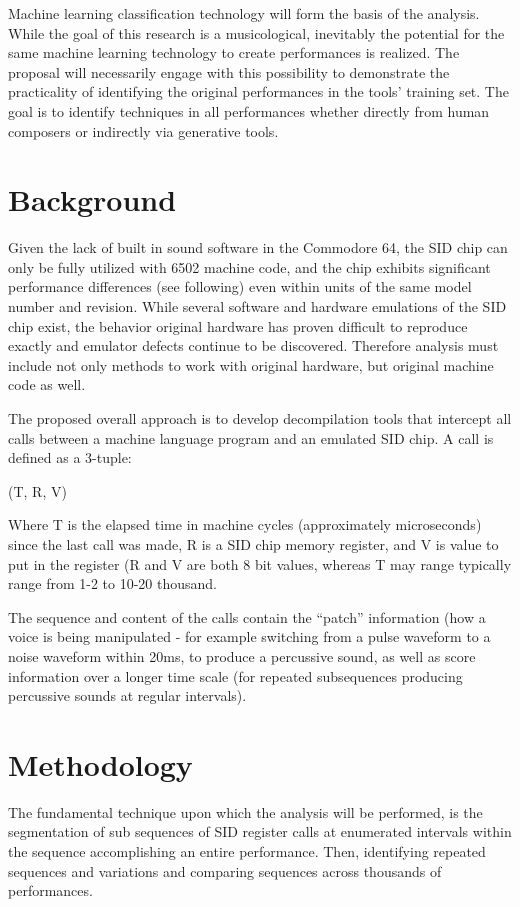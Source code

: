 \documentclass[10pt]{article}
\begin{document}
\begin{multicols*}{2}
  Machine learning classification technology will form the basis of
  the analysis. While the goal of this research is a musicological,
  inevitably the potential for the same machine learning technology to
  create performances is realized. The proposal will necessarily
  engage with this possibility to demonstrate the practicality of
  identifying the original performances in the tools' training
  set. The goal is to identify techniques in all performances whether
  directly from human composers or indirectly via generative tools.

  \section{Background}
  Given the lack of built in sound software in the Commodore 64, the
  SID chip can only be fully utilized with 6502 machine code, and the
  chip exhibits significant performance differences (see following)
  even within units of the same model number and revision.  While
  several software and hardware emulations of the SID chip exist, the
  behavior original hardware has proven difficult to reproduce exactly
  and emulator defects continue to be discovered.  Therefore analysis
  must include not only methods to work with original hardware, but
  original machine code as well.

  The proposed overall approach is to develop decompilation tools that
  intercept all calls between a machine language program and an
  emulated SID chip. A call is defined as a 3-tuple:

  (T, R, V)

  Where T is the elapsed time in machine cycles (approximately
  microseconds) since the last call was made, R is a SID chip memory
  register, and V is value to put in the register (R and V are both 8
  bit values, whereas T may range typically range from 1-2 to 10-20
  thousand.

  The sequence and content of the calls contain the ``patch''
  information (how a voice is being manipulated - for example
  switching from a pulse waveform to a noise waveform within 20ms, to
  produce a percussive sound, as well as score information over a
  longer time scale (for repeated subsequences producing percussive
  sounds at regular intervals).

  \section{Methodology}
  The fundamental technique upon which the analysis will be performed,
  is the segmentation of sub sequences of SID register calls at
  enumerated intervals within the sequence accomplishing an entire
  performance. Then, identifying repeated sequences and variations and
  comparing sequences across thousands of performances.


\end{multicols*}
\end{document}
